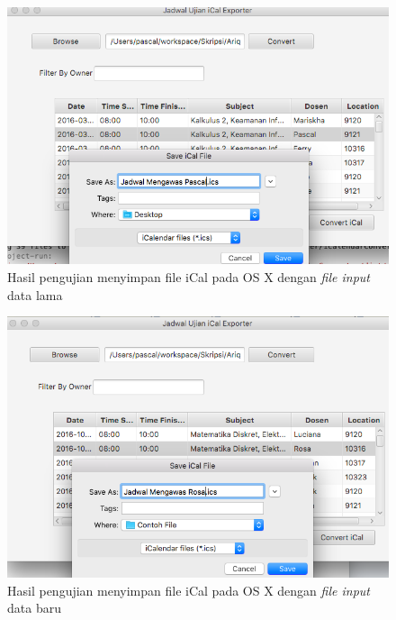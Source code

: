 		\begin{figure}[H]
			\centering
			\includegraphics[scale=0.5]{Gambar/Save-iCal-on-Mac}
			\caption{Hasil pengujian menyimpan file iCal pada OS X dengan \textit{file input} data lama}
			\label{fig:Save-iCal-on-Mac}
			\end{figure}
		
		\begin{figure}[H]
			\centering
			\includegraphics[scale=0.5]{Gambar/Save-iCal-Data-Baru-on-Mac}
			\caption{Hasil pengujian menyimpan file iCal pada OS X dengan \textit{file input} data baru}
			\label{fig:Save-iCal-Data-Baru-on-Mac}
			\end{figure}
		
